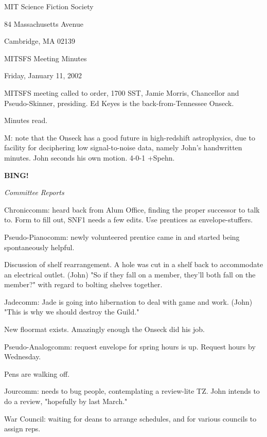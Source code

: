 \documentclass[12pt]{article}
\newcommand{\bing}{{\bf BING!} }
\newcommand{\goto}[1]{\bing \vskip 12pt \centerline{{\em{#1}}}}
\begin{document}
\begin{center}

MIT Science Fiction Society 

84 Massachusetts Avenue

Cambridge, MA 02139

\vspace{12pt}

MITSFS Meeting Minutes 

Friday, January 11, 2002

\end{center}
 
\vspace{18pt}

\setlength{\parskip}{6pt}

\noindent
MITSFS meeting called to order, 1700 SST, Jamie Morris, Chancellor and Pseudo-Skinner, presiding.  Ed Keyes is the back-from-Tennessee Onseck.

Minutes read.

M: note that the Onseck has a good future in high-redshift astrophysics, due to facility for deciphering low signal-to-noise data, namely John's handwritten minutes. John seconds his own motion. 4-0-1 +Spehn.

\goto{Committee Reports}

Chroniccomm: heard back from Alum Office, finding the proper successor to talk to. Form to fill out, SNF1 needs a few edits. Use prentices as envelope-stuffers.

Pseudo-Pianocomm: newly volunteered prentice came in and started being spontaneously helpful.

Discussion of shelf rearrangement. A hole was cut in a shelf back to accommodate an electrical outlet. (John) "So if they fall on a member, they'll both fall on the member?" with regard to bolting shelves together.

Jadecomm: Jade is going into hibernation to deal with game and work. (John) "This is why we should destroy the Guild."

New floormat exists. Amazingly enough the Onseck did his job.

Pseudo-Analogcomm: request envelope for spring hours is up. Request hours by Wednesday.

Pens are walking off.

Jourcomm: needs to bug people, contemplating a review-lite TZ. John intends to do a review, "hopefully by last March."

War Council: waiting for deans to arrange schedules, and for various councils to assign reps.
\end{document}
